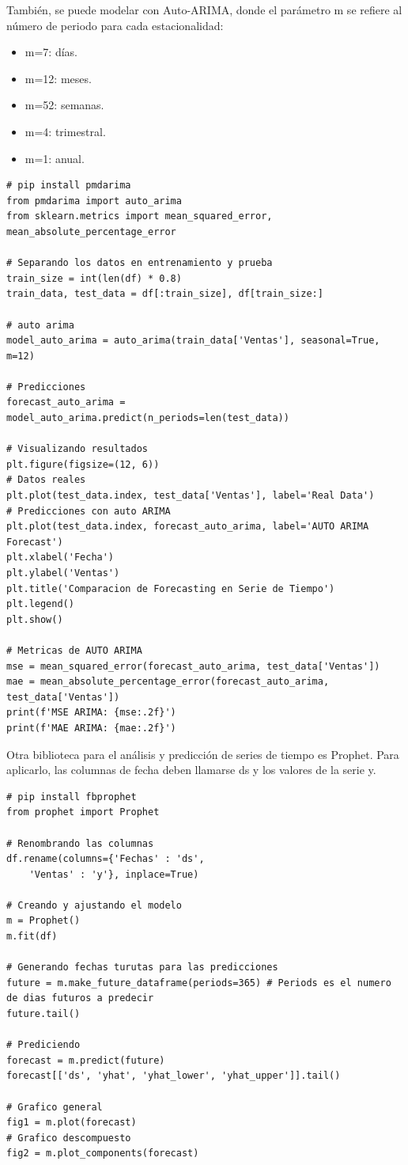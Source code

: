 \documentclass[a4paper, 12pt]{book}
\begin{document}
También, se puede modelar con Auto-ARIMA, donde el parámetro m se refiere al número de periodo para cada estacionalidad:
\begin{itemize}
	\item m=7: días.
	\item m=12: meses.
	\item m=52: semanas.
	\item m=4: trimestral.
	\item m=1: anual.
\end{itemize}
\begin{verbatim}
# pip install pmdarima
from pmdarima import auto_arima
from sklearn.metrics import mean_squared_error, mean_absolute_percentage_error
	
# Separando los datos en entrenamiento y prueba
train_size = int(len(df) * 0.8)
train_data, test_data = df[:train_size], df[train_size:]

# auto arima
model_auto_arima = auto_arima(train_data['Ventas'], seasonal=True, m=12)

# Predicciones
forecast_auto_arima = model_auto_arima.predict(n_periods=len(test_data))
	
# Visualizando resultados
plt.figure(figsize=(12, 6))
# Datos reales
plt.plot(test_data.index, test_data['Ventas'], label='Real Data')
# Predicciones con auto ARIMA
plt.plot(test_data.index, forecast_auto_arima, label='AUTO ARIMA Forecast')
plt.xlabel('Fecha')
plt.ylabel('Ventas')
plt.title('Comparacion de Forecasting en Serie de Tiempo')
plt.legend()
plt.show()

# Metricas de AUTO ARIMA
mse = mean_squared_error(forecast_auto_arima, test_data['Ventas'])
mae = mean_absolute_percentage_error(forecast_auto_arima, test_data['Ventas'])
print(f'MSE ARIMA: {mse:.2f}')
print(f'MAE ARIMA: {mae:.2f}')
\end{verbatim}

Otra biblioteca para el análisis y predicción de series de tiempo es Prophet. Para aplicarlo, las columnas de fecha deben llamarse ds y los valores de la serie y.
\begin{verbatim}
# pip install fbprophet
from prophet import Prophet

# Renombrando las columnas
df.rename(columns={'Fechas' : 'ds',
	'Ventas' : 'y'}, inplace=True)

# Creando y ajustando el modelo
m = Prophet()
m.fit(df)

# Generando fechas turutas para las predicciones
future = m.make_future_dataframe(periods=365) # Periods es el numero de dias futuros a predecir
future.tail()

# Prediciendo
forecast = m.predict(future)
forecast[['ds', 'yhat', 'yhat_lower', 'yhat_upper']].tail()

# Grafico general
fig1 = m.plot(forecast)
# Grafico descompuesto
fig2 = m.plot_components(forecast)
\end{verbatim}
\end{document}
